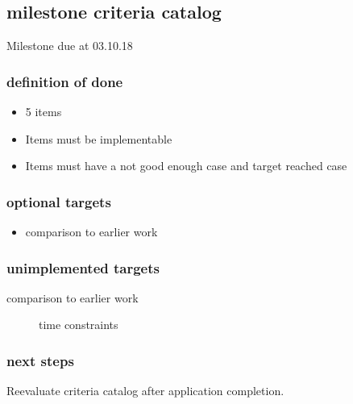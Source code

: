 \documentclass{article}
\begin{document}
\subsection{milestone criteria catalog}

Milestone due at 03.10.18

\subsubsection{definition of done}
\begin{itemize}
    \item 5 items \checkmark
    \item Items must be implementable \checkmark
    \item Items must have a not good enough case and target reached case \checkmark
\end{itemize}

\subsubsection{optional targets}
\begin{itemize}
    \item comparison to earlier work
\end{itemize}

\subsubsection{unimplemented targets}
\begin{description}
    \item[comparison to earlier work] time constraints
\end{description}

\subsubsection{next steps}
Reevaluate criteria catalog after application completion.
\end{document}
